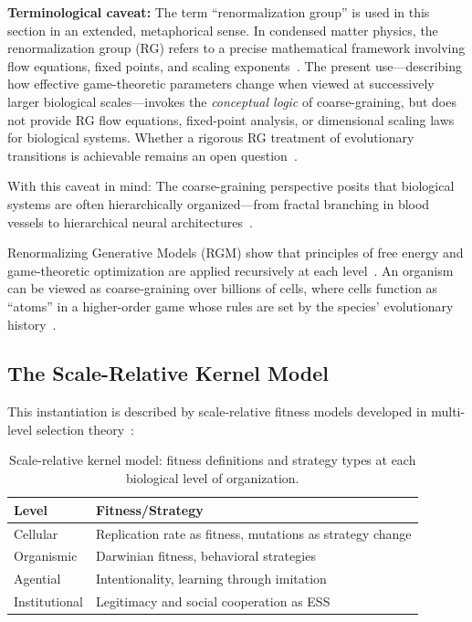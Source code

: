 \documentclass[12pt,a4paper]{article}
\theoremstyle{remark}
\begin{document}
\textbf{Terminological caveat:} The term ``renormalization group'' is used in this section in an extended, metaphorical sense. In condensed matter physics, the renormalization group (RG) refers to a precise mathematical framework involving flow equations, fixed points, and scaling exponents~\citep{ScaleRGResearch}. The present use---describing how effective game-theoretic parameters change when viewed at successively larger biological scales---invokes the \emph{conceptual logic} of coarse-graining, but does not provide RG flow equations, fixed-point analysis, or dimensional scaling laws for biological systems. Whether a rigorous RG treatment of evolutionary transitions is achievable remains an open question~\citep{ScaleRGFrontiers}.

With this caveat in mind: The coarse-graining perspective posits that biological systems are often hierarchically organized---from fractal branching in blood vessels to hierarchical neural architectures~\citep{SelfSimilarNetworks}.

Renormalizing Generative Models (RGM) show that principles of free energy and game-theoretic optimization are applied recursively at each level~\citep{ScaleRGFrontiers}. An organism can be viewed as coarse-graining over billions of cells, where cells function as ``atoms'' in a higher-order game whose rules are set by the species' evolutionary history~\citep{ReplicatorOptimization}.

\subsection{The Scale-Relative Kernel Model}

This instantiation is described by scale-relative fitness models developed in multi-level selection theory~\citep{Okasha2006,Michod1999,ReplicatorOptimization}:

\begin{table}[htbp]
\centering
\caption{Scale-relative kernel model: fitness definitions and strategy types at each biological level of organization.}
\label{tab:scale-kernel}
\begin{tabularx}{\textwidth}{@{}L{0.25\textwidth} Y@{}}
\toprule
\textbf{Level} & \textbf{Fitness/Strategy} \\
\midrule
Cellular & Replication rate as fitness, mutations as strategy change \\
Organismic & Darwinian fitness, behavioral strategies \\
Agential & Intentionality, learning through imitation \\
Institutional & Legitimacy and social cooperation as ESS \\
\bottomrule
\end{tabularx}
\end{table}
\end{document}
